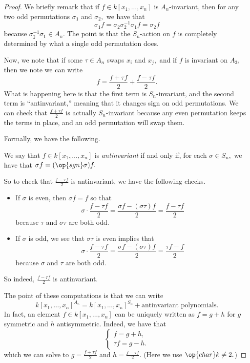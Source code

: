 \documentclass[../notes.tex]{subfiles}
\begin{document}
\begin{proof}
	We briefly remark that if $f\in k[x_1,\ldots,x_n]$ is $A_n$-invariant, then for any two odd permutations $\sigma_1$ and $\sigma_2,$ we have that
	\[\sigma_1f=\sigma_2\sigma_2^{-1}\sigma_1f=\sigma_2f\]
	because $\sigma_2^{-1}\sigma_1\in A_n.$ The point is that the $S_n$-action on $f$ is completely determined by what a single odd permutation does.
	
	Now, we note that if some $\tau\in A_n$ swaps $x_i$ and $x_j,$ and if $f$ is invariant on $A_3,$ then we note we can write
	\[f=\frac{f+\tau f}2+\frac{f-\tau f}2.\]
	What is happening here is that the first term is $S_n$-invariant, and the second term is ``antinvariant,'' meaning that it changes sign on odd permutations. We can check that $\frac{f+\tau f}2$ is actually $S_n$-invariant because any even permutation keeps the terms in place, and an odd permutation will swap them.
	
	Formally, we have the following.
	\begin{definition}[Antinvariant]
		We say that $f\in k[x_1,\ldots,x_n]$ is \textit{antinvariant} if and only if, for each $\sigma\in S_n,$ we have that $\sigma f=(\op{sgn}\sigma)f.$
	\end{definition}
	So to check that $\frac{f-\tau f}2$ is antinvariant, we have the following checks.
	\begin{itemize}
		\item If $\sigma$ is even, then $\sigma f=f$ so that
		\[\sigma\cdot\frac{f-\tau f}2=\frac{\sigma f-(\sigma\tau)f}2=\frac{f-\tau f}2\]
		because $\tau$ and $\sigma\tau$ are both odd.
		\item If $\sigma$ is odd, we see that $\sigma\tau$ is even implies that
		\[\sigma\cdot\frac{f-\tau f}2=\frac{\sigma f-(\sigma\tau)f}2=\frac{\tau f-f}2\]
		because $\sigma$ and $\tau$ are both odd.
	\end{itemize}
	So indeed, $\frac{f-\tau f}2$ is antinvariant.

	The point of these computations is that we can write
	\[k[x_1,\ldots,x_n]^{A_n}=k[x_1,\ldots,x_n]^{S_n}+\text{antinvariant polynomials}.\]
	In fact, an element $f\in k[x_1,\ldots,x_n]$ can be uniquely written as $f=g+h$ for $g$ symmetric and $h$ antisymmetric. Indeed, we have that
	\[\begin{cases}
		f = g+h, \\
		\tau f=g-h.
	\end{cases}\]
	which we can solve to $g=\frac{f+\tau f}2$ and $h=\frac{f-\tau f}2.$ (Here we use $\op{char}k\ne2.$)


\end{proof}
\end{document}
